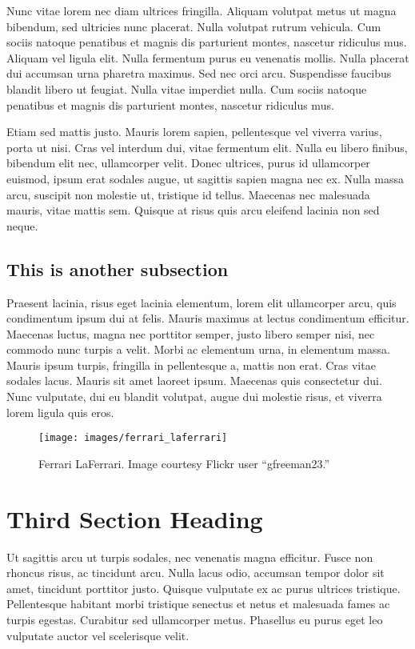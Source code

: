 Nunc vitae lorem nec diam ultrices fringilla. Aliquam volutpat metus ut magna bibendum, sed ultricies nunc placerat. Nulla volutpat rutrum vehicula. Cum sociis natoque penatibus et magnis dis parturient montes, nascetur ridiculus mus. Aliquam vel ligula elit. Nulla fermentum purus eu venenatis mollis. Nulla placerat dui accumsan urna pharetra maximus. Sed nec orci arcu. Suspendisse faucibus blandit libero ut feugiat. Nulla vitae imperdiet nulla. Cum sociis natoque penatibus et magnis dis parturient montes, nascetur ridiculus mus.

Etiam sed mattis justo. Mauris lorem sapien, pellentesque vel viverra varius, porta ut nisi. Cras vel interdum dui, vitae fermentum elit. Nulla eu libero finibus, bibendum elit nec, ullamcorper velit. Donec ultrices, purus id ullamcorper euismod, ipsum erat sodales augue, ut sagittis sapien magna nec ex. Nulla massa arcu, suscipit non molestie ut, tristique id tellus. Maecenas nec malesuada mauris, vitae mattis sem. Quisque at risus quis arcu eleifend lacinia non sed neque.

\subsection{This is another subsection}

Praesent lacinia, risus eget lacinia elementum, lorem elit ullamcorper arcu, quis condimentum ipsum dui at felis. Mauris maximus at lectus condimentum efficitur. Maecenas luctus, magna nec porttitor semper, justo libero semper nisi, nec commodo nunc turpis a velit. Morbi ac elementum urna, in elementum massa. Mauris ipsum turpis, fringilla in pellentesque a, mattis non erat. Cras vitae sodales lacus. Mauris sit amet laoreet ipsum. Maecenas quis consectetur dui. Nunc vulputate, dui eu blandit volutpat, augue dui molestie risus, et viverra lorem ligula quis eros.

\begin{figure}[ht]
  \centering
  \texttt{[image: images/ferrari\_laferrari]}
  \caption{Ferrari LaFerrari. Image courtesy Flickr user ``gfreeman23.''}
  \label{fig:ferrari}
\end{figure}

\section{Third Section Heading}

Ut sagittis arcu ut turpis sodales, nec venenatis magna efficitur. Fusce non rhoncus risus, ac tincidunt arcu. Nulla lacus odio, accumsan tempor dolor sit amet, tincidunt porttitor justo. Quisque vulputate ex ac purus ultrices tristique. Pellentesque habitant morbi tristique senectus et netus et malesuada fames ac turpis egestas. Curabitur sed ullamcorper metus. Phasellus eu purus eget leo vulputate auctor vel scelerisque velit.

